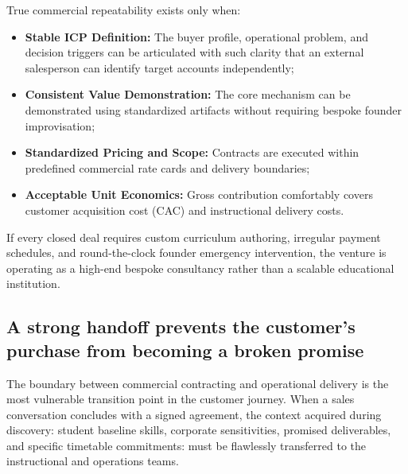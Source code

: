 True commercial repeatability exists only when:
\begin{itemize}
\item \textbf{Stable ICP Definition:} The buyer profile, operational problem, and decision triggers can be articulated with such clarity that an external salesperson can identify target accounts independently;
\item \textbf{Consistent Value Demonstration:} The core mechanism can be demonstrated using standardized artifacts without requiring bespoke founder improvisation;
\item \textbf{Standardized Pricing and Scope:} Contracts are executed within predefined commercial rate cards and delivery boundaries;
\item \textbf{Acceptable Unit Economics:} Gross contribution comfortably covers customer acquisition cost (CAC) and instructional delivery costs.
\end{itemize}
If every closed deal requires custom curriculum authoring, irregular payment schedules, and round-the-clock founder emergency intervention, the venture is operating as a high-end bespoke consultancy rather than a scalable educational institution.

\subsection{A strong handoff prevents the customer's purchase from becoming a broken promise}

The boundary between commercial contracting and operational delivery is the most vulnerable transition point in the customer journey. When a sales conversation concludes with a signed agreement, the context acquired during discovery: student baseline skills, corporate sensitivities, promised deliverables, and specific timetable commitments: must be flawlessly transferred to the instructional and operations teams.

